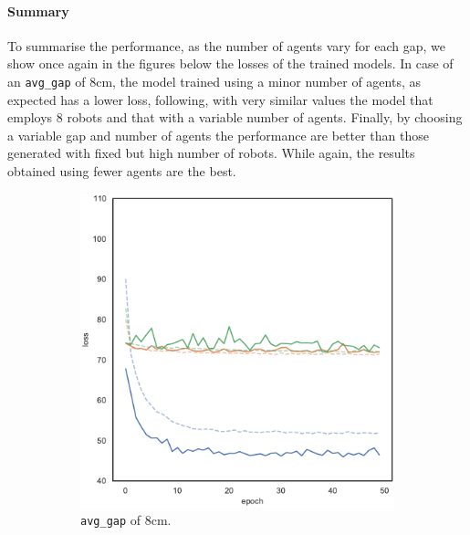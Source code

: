\paragraph*{Summary}
To summarise the performance, as the number of agents vary for each gap, we 
show once again in the figures below the losses of the trained models.
In case of an \texttt{avg\_gap} of $8$cm, the model trained using 
a minor number of agents, as expected has a lower loss, following, with very 
similar values the model that employs 8 robots and that with a variable number of 
agents.
Finally, by choosing a variable gap and number of agents the performance are 
better than those generated with fixed but high number of robots. While again, 
the results obtained using fewer agents are the best.
\begin{figure}[!htb]
	\centering
	\begin{subfigure}[h]{0.3\textwidth}
		\centering
		\includegraphics[width=\textwidth]{contents/images/task1-extension/loss-distributed-gap_8@copy}%
		\caption{\texttt{avg\_gap} of $8$cm.}
	\end{subfigure}
	\hfill
	\begin{subfigure}[h]{0.3\textwidth}
		\centering

\end{subfigure}
\end{figure}
